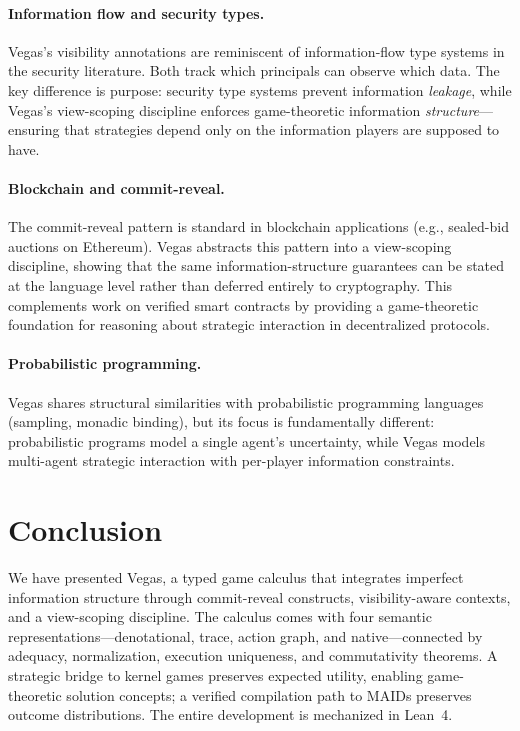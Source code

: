 \documentclass[11pt]{article}
\begin{document}
\paragraph{Information flow and security types.}
Vegas's visibility annotations are reminiscent of information-flow type systems
in the security literature. Both track which principals can observe which data.
The key difference is purpose: security type systems prevent information
\emph{leakage}, while Vegas's view-scoping discipline enforces game-theoretic information
\emph{structure}---ensuring that strategies depend only on the information
players are supposed to have.

\paragraph{Blockchain and commit-reveal.}
The commit-reveal pattern is standard in blockchain applications (e.g.,
sealed-bid auctions on Ethereum). Vegas abstracts this pattern into a
view-scoping discipline, showing that the same information-structure guarantees
can be stated at the language level rather than deferred entirely to cryptography. This complements work
on verified smart contracts by providing a game-theoretic foundation for
reasoning about strategic interaction in decentralized protocols.

\paragraph{Probabilistic programming.}
Vegas shares structural similarities with probabilistic programming languages
(sampling, monadic binding), but its focus is fundamentally different:
probabilistic programs model a single agent's uncertainty, while Vegas models
multi-agent strategic interaction with per-player information constraints.


\section{Conclusion}\label{sec:conclusion}

We have presented Vegas, a typed game calculus that integrates imperfect
information structure through commit-reveal constructs, visibility-aware
contexts, and a view-scoping discipline. The calculus comes with four
semantic representations---denotational, trace, action graph, and
native---connected by adequacy, normalization, execution uniqueness, and
commutativity theorems. A strategic bridge to kernel games preserves expected
utility, enabling game-theoretic solution concepts; a verified compilation
path to MAIDs preserves outcome distributions. The entire development is
mechanized in Lean~4.
\end{document}
